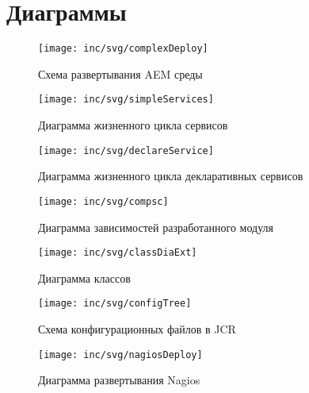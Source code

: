 \chapter{Диаграммы}
\label{cha:appendix1}

\begin{figure}
  \centering
  \texttt{[image: inc/svg/complexDeploy]}
  \caption{Схема развертывания AEM среды}
  \label{fig:complexDeploy}
\end{figure}

\begin{figure}
  \centering
  \texttt{[image: inc/svg/simpleServices]}
  \caption{Диаграмма жизненного цикла сервисов}
  \label{fig:simpleServices}
\end{figure}

\begin{figure}
  \centering
  \texttt{[image: inc/svg/declareService]}
  \caption{Диаграмма жизненного цикла декларативных сервисов}
  \label{fig:declareService}
\end{figure}

\begin{figure}
  \centering
  \texttt{[image: inc/svg/compsc]}
  \caption{Диаграмма зависимостей разработанного модуля}
  \label{fig:comps}
\end{figure}

\begin{figure}
  \centering
  \texttt{[image: inc/svg/classDiaExt]}
  \caption{Диаграмма классов}
  \label{fig:classDia}
\end{figure}

\begin{figure}
	\centering
	\texttt{[image: inc/svg/configTree]}
	\caption{Схема конфигурационных файлов в JCR}
	\label{fig:configTree}
\end{figure}

\begin{figure}
  \centering
  \texttt{[image: inc/svg/nagiosDeploy]}
  \caption{Диаграмма развертывания Nagios}
  \label{fig:nagiosDeploy}
\end{figure}


